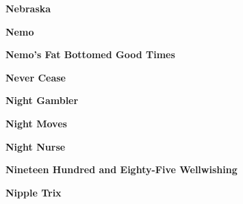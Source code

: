 \newline
\vspace{10pt} 
\begin{center}\textbf{Nebraska}\end{center}
\newline
\vspace{10pt} 
\begin{center}\textbf{Nemo}\end{center}
\newline
\vspace{10pt} 
\begin{center}\textbf{Nemo's Fat Bottomed Good Times}\end{center}
\newline
\vspace{10pt} 
\begin{center}\textbf{Never Cease}\end{center}
\newline
\vspace{10pt} 
\begin{center}\textbf{Night Gambler}\end{center}
\newline
\vspace{10pt} 
\begin{center}\textbf{Night Moves}\end{center}
\newline
\vspace{10pt} 
\begin{center}\textbf{Night Nurse}\end{center}
\newline
\vspace{10pt} 
\begin{center}\textbf{Nineteen Hundred and Eighty-Five Wellwishing}\end{center}
\newline
\vspace{10pt} 
\begin{center}\textbf{Nipple Trix}\end{center}
\newline
\vspace{10pt} 
